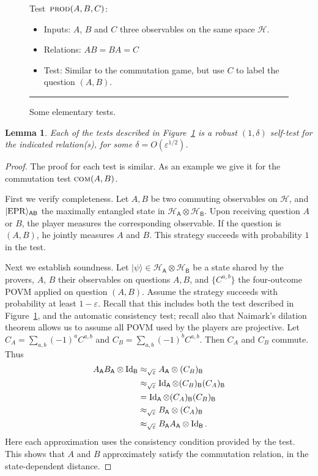 \documentclass[11pt]{article}
\newtheorem{lemma}[theorem]{Lemma}
\theoremstyle{remark}
\theoremstyle{definition}
\newcommand{\ket}[1]{|#1\rangle}
\newcommand{\Id}{\ensuremath{\mathop{\rm Id}\nolimits}}
\newcommand{\reg}[1]{{\textsf{#1}}}
\newcommand{\mH}{\mathcal{H}}
\newcommand{\eps}{\varepsilon}
\newcommand{\EPR}{{\rm EPR}}
\newcommand{\prodt}{\textsc{prod}}
\newcommand{\comt}{\textsc{com}}
\begin{document}
\begin{figure}[H]
\begin{itemize}
\end{itemize}
Test~$\prodt(A,B,C)$:
\begin{itemize}
    \item Inputs: $A$, $B$ and $C$ three observables on the same space $\mH$.
    \item Relations: $AB=BA=C$
    \item Test: Similar to the commutation game, but use $C$ to label the question $(A,B)$.
\end{itemize}
\rule[2ex]{16.5cm}{0.5pt}\vspace{-1cm}
\caption{Some elementary tests.}
\label{fig:elementary}
\end{figure}

\begin{lemma}\label{lem:elementary}
Each of the tests described in Figure~\ref{fig:elementary} is a robust $(1,\delta)$ self-test for the indicated relation(s), for some $\delta = O(\eps^{1/2})$. 
\end{lemma}

\begin{proof}
The proof for each test is similar. As an example we give it for the commutation test $\comt(A,B)$. 

First we verify completeness. Let $A,B$ be two commuting observables on $\mH$, and $\ket{\EPR}_{\reg{AB}}$ the maximally entangled state in $\mH_\reg{A}\otimes \mH_\reg{B}$. Upon receiving question $A$ or $B$, the player measures the corresponding observable. If the question is $(A,B)$, he jointly measures $A$ and $B$. This strategy succeeds with probability $1$ in the test. 

Next we establish soundness. Let $\ket{\psi} \in \mH_{\reg{A}}\otimes \mH_\reg{B}$ be a state shared by the provers, $A$, $B$ their observables on questions $A,B$, and $\{C^{a,b}\}$ the four-outcome POVM applied on question $(A,B)$. Assume the strategy succeeds with probability at least $1-\eps$. Recall that this includes both the test described in Figure~\ref{fig:elementary}, and the automatic consistency test; recall also that Naimark's dilation theorem allows us to assume all POVM used by the players are projective. Let $C_A = \sum_{a,b} (-1)^a C^{a,b}$ and $C_B = \sum_{a,b} (-1)^b C^{a,b}$. Then $C_A$ and $C_B$ commute. Thus
\begin{align*}
A_\reg{A} B_\reg{A} \otimes \Id_\reg{B}
&\approx_{\sqrt{\eps}} A_\reg{A} \otimes (C_B)_\reg{B}\\
&\approx_{\sqrt{\eps}} \Id_\reg{A} \otimes (C_B)_\reg{B}(C_A)_\reg{B}\\
&=  \Id_\reg{A} \otimes (C_A)_\reg{B}(C_B)_\reg{B}\\
&\approx_{\sqrt{\eps}} B_\reg{A} \otimes (C_A)_\reg{B}\\
&\approx_{\sqrt{\eps}} B_\reg{A} A_\reg{A} \otimes \Id_\reg{B}.
\end{align*}
Here each approximation uses the consistency condition provided by the test. This shows that $A$ and $B$ approximately satisfy the commutation relation, in the state-dependent distance. 
\end{proof}
\end{document}
